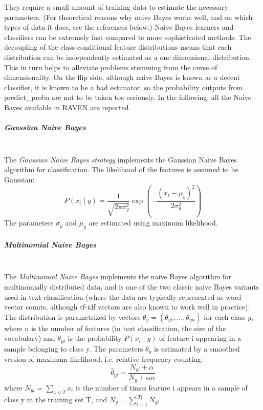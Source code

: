 %
They require a small amount of training data to estimate the necessary
parameters.
%
(For theoretical reasons why naive Bayes works well, and on which types of data
it does, see the references below.)
Naive Bayes learners and classifiers can be extremely fast compared to more
sophisticated methods.
%
The decoupling of the class conditional feature distributions means that each
distribution can be independently estimated as a one dimensional distribution.
%
This in turn helps to alleviate problems stemming from the curse of
dimensionality.
%
On the flip side, although naive Bayes is known as a decent classifier, it is
known to be a bad estimator, so the probability outputs from predict\_proba are
not to be taken too seriously.
%
In the following, all the Naive Bayes available in RAVEN are reported.
%
\subparagraph{Gaussian Naive Bayes}
\mbox{}
\\The \textit{Gaussian Naive Bayes strategy} implements the Gaussian Naive Bayes
algorithm for classification.
%
The likelihood of the features is assumed to be Gaussian:
\begin{equation}
P(x_i \mid y) = \frac{1}{\sqrt{2\pi\sigma^2_y}} \exp\left(-\frac{(x_i -
  \mu_y)^2}{2\sigma^2_y}\right)
\end{equation}
The parameters $\sigma_y$ and $\mu_y$ are estimated using maximum likelihood.
%
%
\subparagraph{Multinomial Naive Bayes}
\mbox{}
\\The \textit{Multinomial Naive Bayes} implements the naive Bayes algorithm for
multinomially distributed data, and is one of the two classic naive Bayes
variants used in text classification (where the data are typically represented
as word vector counts, although tf-idf vectors are also known to work well in
practice).
%
The distribution is parametrized by vectors $\theta_y =
(\theta_{y1},\ldots,\theta_{yn})$ for each class $y$, where n is the number of
features (in text classification, the size of the vocabulary) and $\theta_{yi}$
is the probability $P(x_i \mid y)$ of feature i appearing in a sample belonging
to class y.
%
The parameters $\theta_y$ is estimated by a smoothed version of maximum
likelihood, i.e. relative frequency counting:
\begin{equation}
\hat{\theta}_{yi} = \frac{ N_{yi} + \alpha}{N_y + \alpha n}
\end{equation}
where $N_{yi} = \sum_{x \in T} x_i$ is the number of times feature i appears in
a sample of class y in the training set T, and $N_{y} = \sum_{i=1}^{|T|} N_{yi}$
